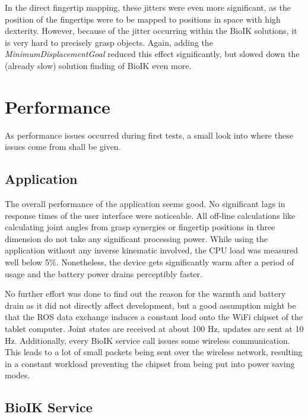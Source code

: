 In the direct fingertip mapping, these jitters were even more significant, as the position of the fingertips were to be mapped to positions in space with high dexterity. However, because of the jitter occurring within the BioIK solutions, it is very hard to precisely grasp objects. Again, adding the \textit{MinimumDisplacementGoal} reduced this effect significantly, but slowed down the (already slow) solution finding of BioIK even more.

\section{Performance}

As performance issues occurred during first tests, a small look into where these issues come from shall be given.

\subsection{Application}

The overall performance of the application seems good. No significant lags in response times of the user interface were noticeable. All off-line calculations like calculating joint angles from grasp synergies or fingertip positions in three dimension do not take any significant processing power. While using the application without any inverse kinematic involved, the CPU load was measured well below 5\%. Nonetheless, the device gets significantly warm after a period of usage and the battery power drains perceptibly faster. 

No further effort was done to find out the reason for the warmth and battery drain as it did not directly affect development, but a good assumption might be that the ROS data exchange induces a constant load onto the WiFi chipset of the tablet computer. Joint states are received at about 100 Hz, updates are sent at 10 Hz. Additionally, every BioIK service call issues some wireless communication. This leads to a lot of small packets being sent over the wireless network, resulting in a constant workload preventing the chipset from being put into power saving modes.

\subsection{BioIK Service}
\label{sec:eval:ikservice}

